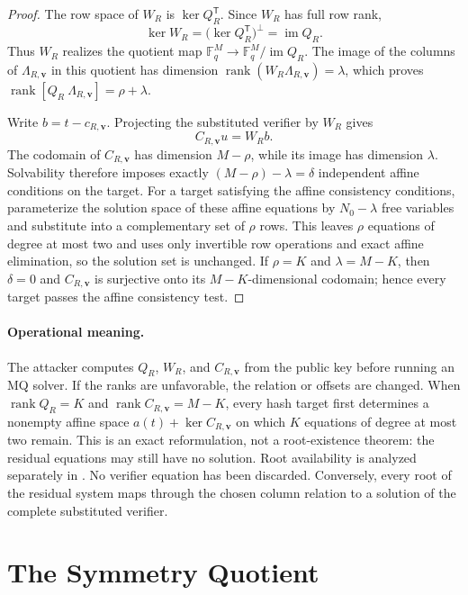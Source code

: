 \documentclass[11pt]{article}
\newcommand{\F}{\mathbb F}
\newcommand{\rank}{\operatorname{rank}}
\newcommand{\transpose}{\mathsf T}
\begin{document}
\begin{proof}
The row space of $W_R$ is $\ker Q_R^\transpose$.  Since $W_R$ has full row
rank,
\[
 \ker W_R=\bigl(\ker Q_R^\transpose\bigr)^\perp=\operatorname{im}Q_R.
\]
Thus $W_R$ realizes the quotient map
$\F_q^M\to\F_q^M/\operatorname{im}Q_R$.  The image of the columns of
$\Lambda_{R,\mathbf v}$ in this quotient has dimension
$\rank(W_R \Lambda_{R,\mathbf v})=\lambda$, which proves
$\rank[Q_R\ \Lambda_{R,\mathbf v}]=\rho+\lambda$.

Write $b=t-c_{R,\mathbf v}$.  Projecting the substituted verifier by $W_R$ gives
\[
 C_{R,\mathbf v}u=W_R b.
\]
The codomain of $C_{R,\mathbf v}$ has dimension $M-\rho$, while its image has
dimension $\lambda$.  Solvability therefore imposes exactly
$(M-\rho)-\lambda=\delta$ independent affine conditions on the target.
For a target satisfying the affine consistency conditions, parameterize the
solution space of these affine equations by $N_0-\lambda$ free variables and
substitute into a complementary set of $\rho$ rows.  This leaves $\rho$
equations of degree at most two and uses only invertible row operations and
exact affine elimination, so the solution set is unchanged.  If $\rho=K$ and
$\lambda=M-K$, then $\delta=0$ and $C_{R,\mathbf v}$ is surjective onto its
$M-K$-dimensional codomain; hence every target passes the affine consistency
test.
\end{proof}

\paragraph{Operational meaning.}
The attacker computes $Q_R$, $W_R$, and $C_{R,\mathbf v}$ from the public key before
running an MQ solver.  If the ranks are unfavorable, the relation or offsets
are changed.  When $\rank Q_R=K$ and $\rank C_{R,\mathbf v}=M-K$, every hash target first
determines a nonempty affine space $a(t)+\ker C_{R,\mathbf v}$ on which
$K$ equations of
degree at most two remain.  This is an exact reformulation, not a root-existence
theorem: the residual equations may still have no solution.  Root availability
is analyzed separately in .  No verifier equation has been
discarded.  Conversely, every root of the residual system maps through the
chosen column relation to a solution of the complete substituted verifier.

\section{The Symmetry Quotient}\label{sec:symmetry}
\end{document}
